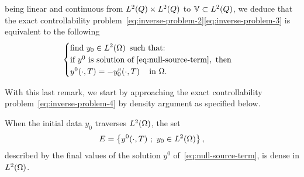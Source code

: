 \begin{remarque}
\begin{equation*}
    \end{equation*}
    being linear and continuous from $L^{2}\!\left({Q}\right)\times L^{2}\!\left({Q}\right)$ to
    $\mathbb{V}\subset L^{2}\!\left({Q}\right)$, we deduce that the exact controllability
    problem~\eqref{eq:inverse-problem-2}\eqref{eq:inverse-problem-3} is
    equivalent to the following
    \begin{equation}\label{eq:inverse-problem-4}
        \begin{cases}\displaystyle
            \text{find}\ y_{0}\in L^{2}\!\left({\Omega}\right)\ \text{such that:}\\
            \text{if}\ y^{0}\ \text{is solution
            of}~\eqref{eq:null-source-term},\ \text{then}\\
            y^{0}\!\left({\cdot,T}\right) = -y_{0}^{v}\!\left({\cdot,
            T}\right)\quad \text{in}\ \Omega.
        \end{cases}
    \end{equation}
\end{remarque}


With this last remark, we start by approaching the exact controllability
problem~\eqref{eq:inverse-problem-4} by density argument as specified
below.

\begin{proposition}\label{propo:controllability-result-1}%
    When the initial data $y_{0}$ traverses $L^{2}\!\left({\Omega}\right)$, the set
    \begin{equation*}\label{eq:controllability-result-1}
        E = \left\{{%
            y^{0}\!\left({\cdot,T}\right)\,;\ y_{0}\in\Ldeux{\Omega}
        }\right\},
    \end{equation*}
    described by the final values of the solution $y^{0}$
    of~\eqref{eq:null-source-term}, is dense in $L^{2}\!\left({\Omega}\right)$.
\end{proposition}

